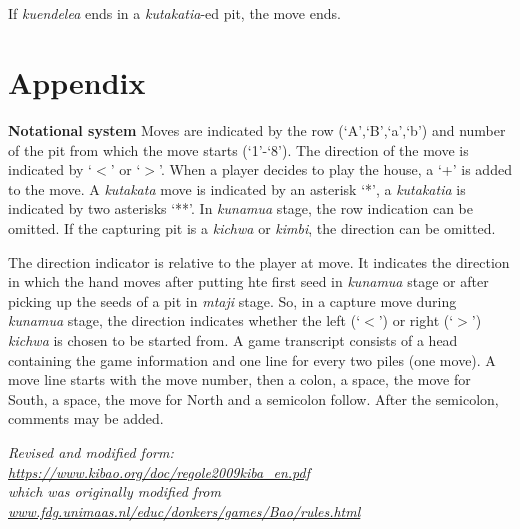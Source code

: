 \documentclass[12pt,a4paper]{article}
\begin{document}
\subsection{}\label{Kut2}
If {\it kuendelea} ends in a {\it kutakatia}-ed pit, the move ends.
\section*{Appendix}\label{App}
{\bf Notational system} Moves are indicated by the row (`A',`B',`a',`b') and number of the pit from which the move starts (`1'-`8'). The direction of the move is indicated by `$<$' or `$>$'. When a player decides to play the house, a `+' is added to the move. A {\it kutakata} move is indicated by an asterisk `*', a {\it kutakatia} is indicated by two asterisks `**'. In {\it kunamua} stage, the row indication can be omitted. If the capturing pit is a {\it kichwa} or {\it kimbi}, the direction can be omitted.

The direction indicator is relative to the player at move.  It indicates the direction in which the hand moves after putting hte first seed in {\it kunamua} stage or after picking up the seeds of a pit in {\it mtaji} stage.  So, in a capture move during {\it kunamua} stage, the direction indicates whether the left (`$<$') or right (`$>$') {\it kichwa} is chosen to be started from.  A game transcript consists of a head containing the game information and one line for every two piles (one move).  A move line starts with the move number, then a colon, a space, the move for South, a space, the move for North and a semicolon follow.  After the semicolon, comments may be added.

{\it Revised and modified form:\\
\url{https://www.kibao.org/doc/regole2009kiba_en.pdf}\\
which was originally modified from\\ 
\url{www.fdg.unimaas.nl/educ/donkers/games/Bao/rules.html}}
\end{document}

